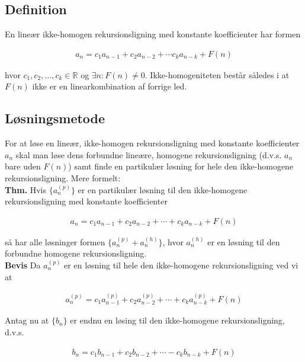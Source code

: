\documentclass[12pt]{article}
\newcommand{\R}{\mathbb{R}}
\begin{document}
\subsection*{Definition}

En lineær ikke-homogen rekursionsligning med konstante koefficienter har formen

\begin{align*}
    a_n=c_1 a_{n-1} + c_2 a_{n-2} + \cdots c_k a_{n-k} + F(n)
\end{align*}

hvor $c_1, c_2, \ldots, c_k \in \R$ og $\exists n: F(n) \ne 0$. Ikke-homogeniteten består således i at $F(n)$ ikke er en linearkombination af forrige led. \\

\subsection*{Løsningsmetode}

For at løse en lineær, ikke-homogen rekursionsligning med konstante koefficienter $a_n$ skal man løse dens forbundne lineære, homogene rekursionsligning (d.v.s. $a_n$ bare uden $F(n)$) samt finde en partikulær løsning for hele den ikke-homogene rekursionsligning. Mere formelt: \\

\textbf{Thm.} Hvis $\{a_n^{(p)}\}$ er en partikulær løsning til den ikke-homogene rekursionsligning med konstante koefficienter 

\begin{align*}
    a_n = c_1 a_{n-1} + c_2 a_{n-2} + \cdots + c_k a_{n-k} + F(n)
\end{align*}

så har alle løsninger formen $\{a_n^{(p)} + a_n^{(h)}\}$, hvor $a_n^{(h)}$ er en løsning til den forbundne homogene rekursionsligning. \\

\textbf{Bevis} Da $a_n^{(p)}$ er en løsning til hele den ikke-homogene rekursionsligning ved vi at 

\begin{align*}
    a_n^{(p)} = c_1 a_{n-1}^{(p)} + c_2 a_{n-2}^{(p)} +\cdots + c_k a_{n-k}^{(p)} + F(n)
\end{align*}

Antag nu at $\{b_n\}$ er endnu en løsing til den ikke-homogene rekursionsligning, d.v.s.

\begin{align*}
    b_n = c_1 b_{n-1} + c_2 b_{n-2} + \cdots - c_k b_{n-k} + F(n)
\end{align*}
\end{document}
